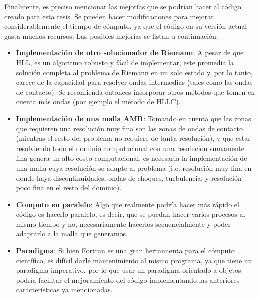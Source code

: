 \documentclass[12pt,a4paper]{book}
\begin{document}
Finalmente, es preciso mencionar las mejorías que se podrían hacer al código creado para esta tesis. Se pueden hacer modificaciones para mejorar considerablemente el tiempo de cómputo, ya que el 
código en su versión actual gasta muchos recursos. Las posibles mejorías se listan a continuación:
\begin{itemize}
    \item \textbf{Implementación de otro solucionador de Riemann}: A pesar de que HLL, es un algoritmo robusto y fácil de implementar, este promedia la solución completa al problema de Riemann en un solo estado y, 
    por lo tanto, carece de la capacidad para resolver ondas intermedias (tales como las ondas de contacto). Se recomienda entonces incorporar otros métodos que tomen en cuenta más ondas (por ejemplo el método de HLLC).
    
    \item \textbf{Implementación de una malla AMR}: Tomando en cuenta que las zonas que requieren una resolución muy fina son las zonas de ondas de contacto (mientras el resto del problema no requiere de tanta resolución), 
    y que estar resolviendo todo el dominio computacional con una resolución sumamente fina genera un alto costo computacional, es necesaria la implementación de una malla cuya resolución se adapte al problema 
    (i.e. resolución muy fina en donde haya discontinuidades, ondas de choques, turbulencia; y resolución poco fina en el resto del dominio). 

    \item \textbf{Computo en paralelo}: Algo que realmente podría hacer más rápido el código es hacerlo paralelo, es decir, que se puedan hacer varios procesos al mismo tiempo y no, necesariamente hacerlos 
    secuencialmente y poder adaptarlo a la malla que generamos.

    \item \textbf{Paradigma}: Si bien Fortran es una gran herramienta para el cómputo científico, es difícil darle mantenimiento al mismo programa, ya que tiene un paradigma imperativo, por lo que usar un paradigma 
    orientado a objetos podría facilitar el mejoramiento del código implementando las anteriores características ya mencionadas.
\end{itemize}

\appendix
\end{document}
